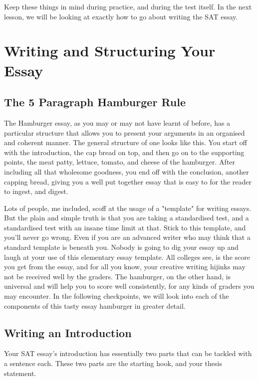 Keep these things in mind during practice, and during the test itself. In the next lesson, we will be looking at exactly how to go about writing the SAT essay.
\section{Writing and Structuring Your Essay}
\subsection{The 5 Paragraph Hamburger Rule}
The Hamburger essay, as you may or may not have learnt of before, has a particular structure that allows you to present your arguments in an organised and coherent manner. The general structure of one looks like this. You start off with the introduction, the cap bread on top, and then go on to the supporting points, the meat patty, lettuce, tomato, and cheese of the hamburger. After including all that wholesome goodness, you end off with the conclusion, another capping bread, giving you a well put together essay that is easy to for the reader to ingest, and digest.

Lots of people, me included, scoff at the usage of a "template" for writing essays. But the plain and simple truth is that you are taking a standardised test, and a standardised test with an insane time limit at that. Stick to this template, and you'll never go wrong. Even if you are an advanced writer who may think that a standard template is beneath you. Nobody is going to dig your essay up and laugh at your use of this elementary essay template. All colleges see, is the score you get from the essay, and for all you know, your creative writing hijinks may not be received well by the graders. The hamburger, on the other hand, is universal and will help you to score well consistently, for any kinds of graders you may encounter. In the following checkpoints, we will look into each of the components of this tasty essay hamburger in greater detail.
\subsection{Writing an Introduction}
Your SAT essay's introduction has essentially two parts that can be tackled with a sentence each. These two parts are the starting hook, and your thesis statement.

